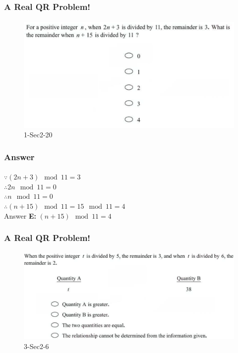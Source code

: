 \documentclass[
	11pt, %
	handout,
]{beamer}
\begin{document}
\begin{frame}
	\frametitle{A Real QR Problem!}
	\framesubtitle{}
	\begin{figure}
		\includegraphics[width=\linewidth]{Remainder_Example_Question1.png}
		\caption{1-Sec2-20}
	\end{figure}

\end{frame}


\begin{frame}
	\frametitle{Answer}
	\framesubtitle{}

	$\because (2n + 3) \mod 11 = 3$ \\
	$\therefore 2n  \mod 11 = 0$ \\
	$\therefore n  \mod 11 = 0$ \\
	$\therefore (n + 15) \mod 11 = 15 \mod 11 = 4$ \\
\pause
\bigskip
Answer \textbf{E: } $ (n + 15) \mod 11 = 4$
\end{frame}


\begin{frame}
	\frametitle{A Real QR Problem!}
	\framesubtitle{}
	\begin{figure}
		\includegraphics[width=\linewidth]{Remainder_Example_Question2.png}
		\caption{3-Sec2-6}
		\end{figure}
\end{frame}
\end{document}
